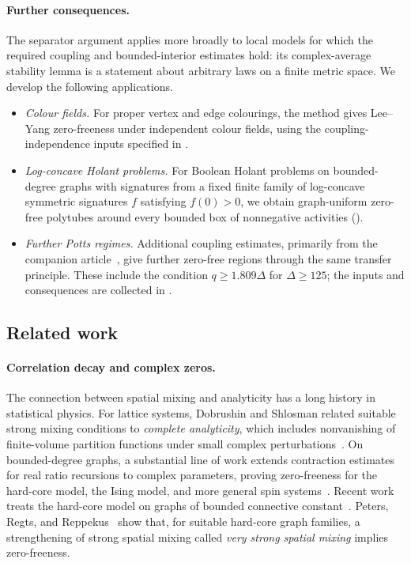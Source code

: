 \documentclass[11pt,reqno]{article}
\theoremstyle{plain}
\theoremstyle{definition}
\theoremstyle{remark}
\theoremstyle{definition}
\theoremstyle{remark}
\newcommand{\Deg}{\Delta}                        %
\begin{document}
\paragraph{Further consequences.}
The separator argument applies more broadly to local models for which
the required coupling and bounded-interior estimates hold: its
complex-average stability lemma is a statement about arbitrary laws on
a finite metric space.  We develop the following applications.
\begin{itemize}
  \item \emph{Colour fields.}
  For proper vertex and edge colourings, the method gives Lee--Yang
  zero-freeness under independent colour fields, using the
  coupling-independence inputs specified in .
  \item \emph{Log-concave Holant problems.}
  For Boolean Holant problems on bounded-degree graphs with signatures
  from a fixed finite family of log-concave symmetric signatures \(f\)
  satisfying \(f(0)>0\), we obtain graph-uniform zero-free polytubes
  around every bounded box of nonnegative activities
  ().
  \item \emph{Further Potts regimes.}
  Additional coupling estimates, primarily from the companion
  article~\cite{ShaoShi2026FurtherPotts}, give further zero-free
  regions through the same transfer principle.  These include the
  condition \(q\ge1.809\Deg\) for \(\Deg\ge125\); the inputs and
  consequences are collected in .
\end{itemize}

\subsection{Related work}

\paragraph{Correlation decay and complex zeros.}
The connection between spatial mixing and analyticity has a long history
in statistical physics.  For lattice systems, Dobrushin and Shlosman
related suitable strong mixing conditions to \emph{complete
analyticity}, which includes nonvanishing of finite-volume partition
functions under small complex
perturbations~\cite{DobrushinShlosman1985,DobrushinShlosman1987}.
On bounded-degree graphs, a substantial line of work extends contraction
estimates for real ratio recursions to complex parameters, proving
zero-freeness for the hard-core model, the Ising model, and more general
spin systems~\cite{PetersRegts2019,LiuSinclairSrivastava2019,PetersRegts2020,ShaoSun2021,LiuSinclairSrivastava2025}.
Recent work treats the hard-core model on graphs of bounded connective
constant~\cite{ChenShaoShi2026}.
Peters, Regts, and Reppekus~\cite{PetersRegtsReppekus2026} show that,
for suitable hard-core graph families, a strengthening of strong spatial
mixing called \emph{very strong spatial mixing} implies zero-freeness.
\end{document}
